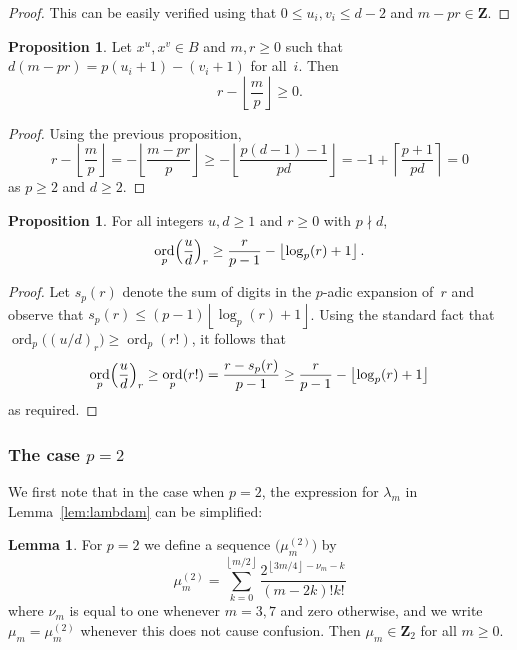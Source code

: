 \documentclass[a4paper,11pt]{article}
\numberwithin{equation}{section}
\providecommand{\floor}[1]{\left\lfloor#1\right\rfloor}   %
\providecommand{\ceil}[1]{\left\lceil#1\right\rceil}   %
\newcommand{\ZZ}{\mathbf{Z}} %
\DeclareMathOperator{\ord}{ord}          %
\theoremstyle{definition}
\newtheorem{lem}[thm]{Lemma}
\newtheorem{prop}[thm]{Proposition}
\begin{document}
\begin{proof}
This can be easily verified using that $0 \leq u_i, v_i \leq d - 2$ 
and $m - pr \in \ZZ$.
\end{proof}

\begin{prop} \label{prop:mpr2}
Let $x^u, x^v \in B$ and $m, r \geq 0$ such that 
$d(m-pr) = p(u_i + 1) - (v_i + 1)$ for all~$i$.  Then 
\begin{equation}
r - \floor{\frac{m}{p}} \geq 0.
\end{equation}
\end{prop}

\begin{proof}
Using the previous proposition,
\begin{equation}
r - \floor{\frac{m}{p}} 
= - \floor{\frac{m-pr}{p}} 
\geq - \floor{\frac{p(d-1)-1}{pd}} 
= -1 + \ceil{\frac{p + 1}{pd}} 
= 0 
\end{equation}
as $p \geq 2$ and $d \geq 2$.
\end{proof}

\begin{prop} \label{prop:rfac}
For all integers $u, d \geq 1$ and $r \geq 0$ with $p \nmid d$, 
\begin{equation}
\ord_p\Bigl(\frac{u}{d}\Bigr)_r \geq \frac{r}{p-1} - \floor{\log_p(r) + 1}.
\end{equation}
\end{prop}

\begin{proof}
Let $s_p(r)$ denote the sum of digits in the $p$-adic expansion of~$r$ 
and observe that $s_p(r) \leq (p-1)\floor{\log_p(r) + 1}$.  Using the 
standard fact that $\ord_p\bigl((u/d)_r\bigr) \geq \ord_p(r!)$, 
it follows that 
\begin{equation}
\ord_p\Bigl(\frac{u}{d}\Bigr)_r \geq \ord_p(r!) = \frac{r - s_p(r)}{p-1} \geq \frac{r}{p-1} - \floor{\log_p(r) + 1}
\end{equation}
as required.
\end{proof}

\subsubsection{The case $p = 2$}

We first note that in the case when $p = 2$, the expression for 
$\lambda_m$ in Lemma~\ref{lem:lambdam} can be simplified:

\begin{lem} \label{lem:mu2}
For $p = 2$ we define a sequence $\bigl(\mu_m^{(2)}\bigr)$ by 
\begin{equation}
\mu_m^{(2)} = 
    \sum_{k=0}^{\floor{m/2}} \frac{2^{\floor{3m/4} - \nu_m - k}}{(m-2k)! k!}
\end{equation}
where $\nu_m$ is equal to one whenever $m = 3, 7$ and zero otherwise, 
and we write $\mu_m =\mu_m^{(2)}$ whenever this does not cause confusion. 
Then $\mu_m \in \ZZ_2$ for all $m \geq 0$.
\end{lem}
\end{document}
